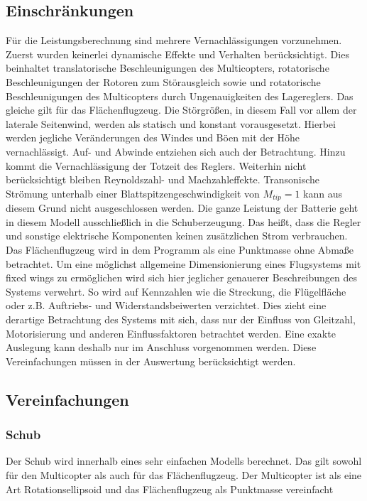 \subsection{Einschränkungen}
Für die Leistungsberechnung sind mehrere Vernachlässigungen vorzunehmen. Zuerst wurden keinerlei dynamische Effekte und Verhalten berücksichtigt. Dies beinhaltet translatorische Beschleunigungen des Multicopters, rotatorische Beschleunigungen der Rotoren zum Störausgleich sowie und rotatorische Beschleunigungen des Multicopters durch Ungenauigkeiten des Lagereglers. Das gleiche gilt für das Flächenflugzeug. 
Die Störgrößen, in diesem Fall vor allem der laterale Seitenwind, werden als statisch und konstant vorausgesetzt. Hierbei werden jegliche Veränderungen des Windes und Böen mit der Höhe vernachlässigt. Auf- und Abwinde entziehen sich auch der Betrachtung. Hinzu kommt die Vernachlässigung der Totzeit des Reglers. 
Weiterhin nicht berücksichtigt bleiben Reynoldszahl- und Machzahleffekte. Transonische Strömung unterhalb einer Blattspitzengeschwindigkeit von \ensuremath{M_{tip}=1} kann aus diesem Grund nicht ausgeschlossen werden.
Die ganze Leistung der Batterie geht in diesem Modell ausschließlich in die Schuberzeugung. Das heißt, dass die Regler und sonstige elektrische Komponenten keinen zusätzlichen Strom verbrauchen.
Das Flächenflugzeug wird in dem Programm als eine Punktmasse ohne Abmaße betrachtet. Um eine möglichst allgemeine Dimensionierung eines Flugsystems mit fixed wings zu ermöglichen wird sich hier jeglicher genauerer Beschreibungen des Systems verwehrt. So wird auf Kennzahlen wie die Streckung, die Flügelfläche oder z.B. Auftriebs- und Widerstandsbeiwerten verzichtet. Dies zieht eine derartige Betrachtung des Systems mit sich, dass nur der Einfluss von Gleitzahl, Motorisierung und anderen Einflussfaktoren betrachtet werden. Eine exakte Auslegung kann deshalb nur im Anschluss vorgenommen werden. Diese Vereinfachungen müssen in der Auswertung berücksichtigt werden.


\subsection{Vereinfachungen}
\subsubsection{Schub}
Der Schub wird innerhalb eines sehr einfachen Modells berechnet. Das gilt sowohl für den Multicopter als auch für das Flächenflugzeug. Der Multicopter ist als eine Art Rotationsellipsoid und das Flächenflugzeug als Punktmasse vereinfacht

